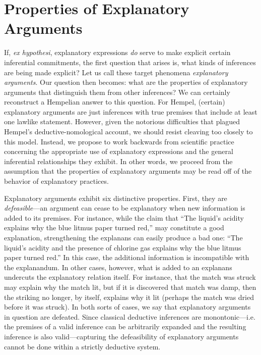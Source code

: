 \documentclass{article}
\theoremstyle{definition}
\theoremstyle{definition}
\theoremstyle{definition}
\theoremstyle{definition}
\theoremstyle{remark}
\theoremstyle{definition}
\theoremstyle{definition}
\begin{document}
\section{Properties of Explanatory Arguments}

If, \textit{ex hypothesi}, explanatory expressions \textit{do} serve to make explicit certain inferential commitments, the first question that arises is, what kinds of inferences are being made explicit? Let us call these target phenomena \textit{explanatory arguments}. Our question then becomes: what are the properties of explanatory arguments that distinguish them from other inferences? We can certainly reconstruct a Hempelian answer to this question. For Hempel, (certain) explanatory arguments are just inferences with true premises that include at least one lawlike statement. However, given the notorious difficulties that plagued Hempel's deductive-nomological account, we should resist cleaving too closely to this model. Instead, we propose to work backwards from scientific practice concerning the appropriate use of explanatory expressions and the general inferential relationships they exhibit. In other words, we proceed from the assumption that the properties of explanatory arguments may be read off of the behavior of explanatory practices.


Explanatory arguments exhibit six distinctive properties. First, they are \textit{defeasible}---an argument can cease to be explanatory when new information is added to its premises. For instance, while the claim that ``The liquid's acidity explains why the blue litmus paper turned red,''  may constitute a good explanation, strengthening the explanans can easily produce a bad one: ``The liquid's acidity and the presence of chlorine gas explains why the blue litmus paper turned red.'' In this case, the additional information is incompatible with the explanandum. In other cases, however, what is added to an explanans undercuts the explanatory relation itself. For instance, that the match was struck may explain why the match lit, but if it is discovered that match was damp, then the striking no longer, by itself, explains why it lit (perhaps the match was dried before it was struck). In both sorts of cases, we say that explanatory arguments in question are defeated. Since classical deductive inferences are monontonic---i.e. the premises of a valid inference can be arbitrarily expanded and the resulting inference is also valid---capturing the defeasibility of explanatory arguments cannot be done within a strictly deductive system.
\end{document}
